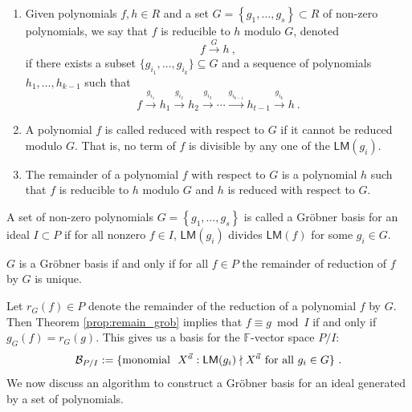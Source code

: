 \documentclass[a4paper,10pt]{article}
\newcommand{\mr}[1]{\mathsf{#1}}
\def\CB{{\cal B}}
\def\CB {{\cal B}}
\def\IF{\mathds{F}}
\begin{document}
\begin{appendix}
\begin{defn}
\begin{enumerate}[(1)]
    We symbolically write the reduction as 
    \begin{equation}
        f\overset{g}{\longrightarrow} h~.
    \end{equation}
    \item Given polynomials $f, h \in R$ and a set $G=\left\{g_1, \ldots, g_s\right\} \subset R$ of non-zero polynomials, we say that $f$ is reducible to $h$ modulo $G$, denoted
\begin{equation}
f \xrightarrow{G} h~,
\end{equation}
if there exists a subset $\{g_{i_1}, \ldots, g_{i_k}\} \subseteq G$ and a sequence of polynomials $h_1, \ldots, h_{k-1}$ such that
\begin{equation}
f \xrightarrow{g_{i_1}} h_1 \xrightarrow{g_{i_2}} h_2 \xrightarrow{g_{i_3}} \cdots \xrightarrow{g_{i_{k-1}}} h_{t-1} \xrightarrow{g_{i_k}} h~ .
\end{equation}
\item A polynomial $f$ is called reduced with respect to $G$ if it cannot be reduced modulo $G$. That is, no term of $f$ is divisible by any one of the $\mr{LM}\left(g_i\right)$.
\item The remainder of a polynomial $f$ with respect to $G$ is a polynomial $h$ such that $f$ is reducible to $h$ modulo $G$ and $h$ is reduced with respect to $G$. 
\end{enumerate}    
\end{defn}
\begin{defn}
A set of non-zero polynomials $G=\left\{g_1, \ldots, g_s\right\}$ is called a Gr\"{o}bner basis for an ideal $I\subset P$ if for all nonzero $f \in I$, $\mr{LM}\left(g_i\right)$ divides $\mr{LM}(f)$ for some $g_i \in G$.
\end{defn} 
\begin{thm}\emph{\cite[Theorem 1.6.7]{loustaunau1994introduction}}\label{prop:remain_grob}
$G$ is a Gr\"{o}bner basis if and only if for all $f \in P$ the remainder of reduction of $f$ by $G$ is unique.    
\end{thm}
Let $r_G(f)\in P$ denote the remainder of the reduction of a polynomial $f$ by $G$. Then Theorem \ref{prop:remain_grob} implies that $f\equiv g\bmod I$ if and only if $g_G(f)=r_G(g)$. This gives us a basis for the $\IF$-vector space $P/I$:
\begin{equation}
    \CB_{P/I}:=\{\text{monomial}~~X^{\vec{a}}:\mr{LM}(g_i)\nmid X^{\vec{a}}\text{ for all }g_i\in G\}~.
\end{equation}
We now discuss an algorithm to construct a Gr\"{o}bner basis for an ideal generated by a set of polynomials. 

\end{appendix}
\end{document}
